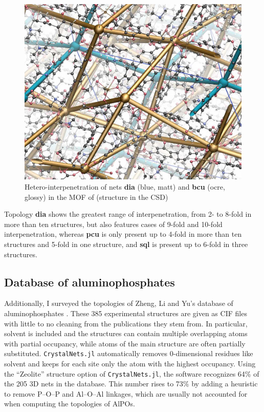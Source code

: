 \documentclass[main.tex]{subfiles}
\begin{document}
\begin{figure}
	\centering
	\includegraphics[width=0.9\linewidth]{figures/topology/WEBZEKinterpenetration.jpg}
	\caption{Hetero-interpenetration of nets \textbf{dia} (blue, matt) and \textbf{bcu} (ocre, glossy) in the MOF of \textcite{Heterointerpenetration} (structure  in the CSD\autocite{CSD})}\label{fig:interpenetration}
\end{figure}

Topology \textbf{dia} shows the greatest range of interpenetration, from 2- to 8-fold in more than ten structures, but also features cases of 9-fold and 10-fold interpenetration, whereas \textbf{pcu} is only present up to 4-fold in more than ten structures and 5-fold in one structure, and \textbf{sql} is present up to 6-fold in three structures.

\subsection{Database of aluminophosphates}

Additionally, I surveyed the topologies of Zheng, Li and Yu's database of aluminophosphates \autocite{ALPO}. These 385 experimental structures are given as CIF files with little to no cleaning from the publications they stem from. In particular, solvent is included and the structures can contain multiple overlapping atoms with partial occupancy, while atoms of the main structure are often partially substituted. \texttt{CrystalNets.jl} automatically removes 0-dimensional residues like solvent and keeps for each site only the atom with the highest occupancy. %
Using the ``Zeolite'' structure option of \texttt{CrystalNets.jl}, the software recognizes {64\%} of the 205 3D nets in the database. This number rises to {73\%} by adding a heuristic to remove P--O--P and Al--O--Al linkages, which are usually not accounted for when computing the topologies of AlPOs.
\end{document}
